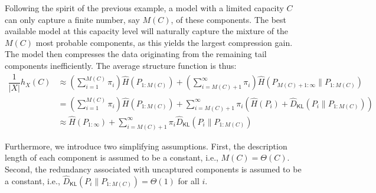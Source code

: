 \documentclass[11pt]{article}
\theoremstyle{plain}
\theoremstyle{definition}
\newcommand{\entropyrate}{\hat{H}}
\newcommand{\KLrate}{\hat{D}_{\mathsf{KL}}}
\begin{document}
Following the spirit of the previous example, a model with a limited capacity \(C\) can only capture a finite number, say \(M(C)\), of these components. The best available model at this capacity level will naturally capture the mixture of the \(M(C)\) most probable components, as this yields the largest compression gain. The model then compresses the data originating from the remaining tail components inefficiently.
The average structure function is thus:
\begin{align*}
    \dfrac{1}{|X|}h_X(C) & \approx
 \left(\sum\limits_{i=1}^{M(C)}\pi_i \right) \entropyrate(P_{1:M(C)}) + \left( \sum\limits_{i=M(C)+1}^{\infty}\pi_i\right)  \entropyrate\left(P_{M(C)+1:\infty}\|P_{1:M(C)}\right)
 \\ & = \left(\sum\limits_{i=1}^{M(C)}\pi_i \right) \entropyrate(P_{1:M(C)}) +  \sum\limits_{i=M(C)+1}^{\infty}\pi_i \left(\entropyrate\left(P_{i}\right)+\KLrate(P_i\|P_{1:M(C)})\right)
 \\ & \approx \entropyrate(P_{1:\infty}) + \sum\limits_{i=M(C)+1}^{\infty}\pi_i\KLrate(P_i\|P_{1:M(C)})
\end{align*}





Furthermore, we introduce two simplifying assumptions. First, the description length of each component is assumed to be a constant, i.e., $M(C)=\Theta(C)$. Second, the redundancy associated with uncaptured components is assumed to be a constant, i.e., $\KLrate\left(P_i\|P_{1:M(C)}\right)=\Theta(1)$ for all $i$.
\end{document}
